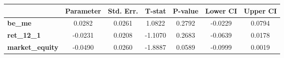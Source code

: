 \begin{tabular}{lcccccc}
\toprule
                        & \textbf{Parameter} & \textbf{Std. Err.} & \textbf{T-stat} & \textbf{P-value} & \textbf{Lower CI} & \textbf{Upper CI}  \\
\midrule
\textbf{be\_me}         &       0.0282       &       0.0261       &      1.0822     &      0.2792      &      -0.0229      &       0.0794       \\
\textbf{ret\_12\_1}     &      -0.0231       &       0.0208       &     -1.1070     &      0.2683      &      -0.0639      &       0.0178       \\
\textbf{market\_equity} &      -0.0490       &       0.0260       &     -1.8887     &      0.0589      &      -0.0999      &       0.0019       \\
\bottomrule
\end{tabular}
